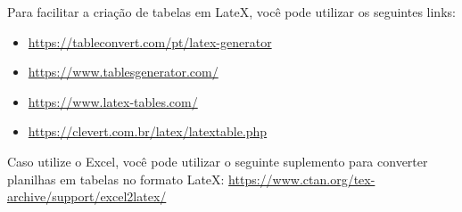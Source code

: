 Para facilitar a criação de tabelas em LateX, você pode utilizar os seguintes links: 
\begin{itemize}
\item \url{https://tableconvert.com/pt/latex-generator}
\item \url{https://www.tablesgenerator.com/}
\item \url{https://www.latex-tables.com/}
\item \url{https://clevert.com.br/latex/latextable.php}
\end{itemize}

Caso utilize o Excel, você pode utilizar o seguinte suplemento para converter planilhas em tabelas no formato LateX: \href{https://www.ctan.org/tex-archive/support/excel2latex/}{https://www.ctan.org/tex-archive/support/excel2latex/}
